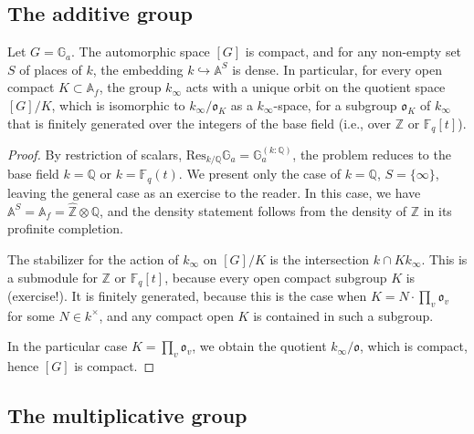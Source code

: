 \subsection{The additive group}
\label{subsection-additive}

\begin{proposition}
\label{proposition-automorphic-Ga}
Let $G = \mathbb G_a$. The automorphic space $[G]$ is compact, and for any non-empty set $S$ of places of $k$, the embedding $k\hookrightarrow \mathbb A^S$ is dense. In particular, for 
every open compact $K\subset \mathbb A_f$, the group $k_\infty$ acts with a unique orbit on the quotient space $[G]/K$, which is isomorphic to $k_\infty / \mathfrak o_K$ as a $k_\infty$-space, for a subgroup $\mathfrak o_K$ of $k_\infty$ that is finitely generated over the integers of the base field (i.e., over $\mathbb Z$ or $\mathbb F_q[t]$).
\end{proposition}

\begin{proof}
 By restriction of scalars, $\text{Res}_{k/\mathbb Q} \mathbb G_a = \mathbb G_a^{(k:\mathbb Q)}$, the problem reduces to the base field $k=\mathbb Q$ or $k=\mathbb F_q(t)$. We present only the case of $k=\mathbb Q$, $S=\{\infty\}$, leaving the general case as an exercise to the reader. In this case, we have $\mathbb A^S = \mathbb A_f = \widehat{\mathbb Z} \otimes \mathbb Q$, and the density statement follows from the density of $\mathbb Z$ in its profinite completion. 
 
 The stabilizer for the action of $k_\infty$ on $[G]/K$ is the intersection $k\cap K k_\infty$. This is a submodule for $\mathbb Z$ or $\mathbb F_q[t]$, because every open compact subgroup $K$ is (exercise!). It is finitely generated, because this is the case when $K = N \cdot \prod_v \mathfrak o_v$ for some $N\in k^\times$, and any compact open $K$ is contained in such a subgroup.
 
 In the particular case $K = \prod_v \mathfrak o_v$, we obtain the quotient $k_\infty/\mathfrak o$, which is compact, hence $[G]$ is compact.
\end{proof}




\subsection{The multiplicative group}
\label{subsection-multiplicative}


